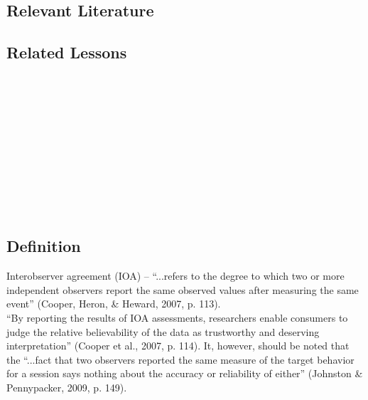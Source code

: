 \subsection{Relevant Literature}
\begin{refsection}
\nocite{cooper2007applied,johnston1993strategies}
\printbibliography[heading=none]
\end{refsection}
%
\subsection{Related Lessons}
\fouraOne{}\\
\fouraTwo{}\\
\fouraThree{}\\
\fouraFour{}\\
\fouraFive{}\\
\fouraSix{}\\
\fouraSeven{}\\
\fouraEight{}\\
\fourhOne{}\\
\fourhTwo{}\\
%
\subsection{Definition} 
Interobserver agreement (IOA) –  ``...refers to the degree to which two or more independent observers report the same observed values after measuring the same event'' (Cooper, Heron, \& Heward, 2007, p. 113).\\

``By reporting the results of IOA assessments, researchers enable consumers to judge the relative believability of the data as trustworthy and deserving interpretation'' (Cooper et al., 2007, p. 114). It, however, should be noted that the ``...fact that two observers reported the same measure of the target behavior for a session says nothing about the accuracy or reliability of either'' (Johnston \& Pennypacker, 2009, p. 149).

